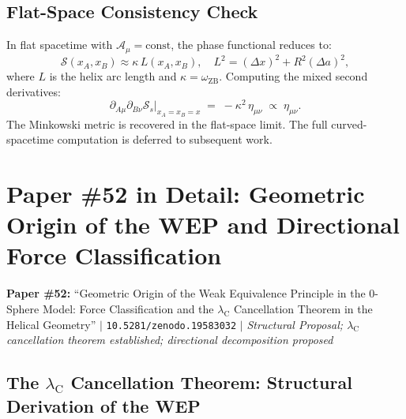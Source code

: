\documentclass[12pt,letterpaper]{article}
\newcommand{\doilink}[1]{\texttt{#1}}
\newcommand{\lambdaC}{\lambda_{\mathrm{C}}}
\newcommand{\calS}{\mathcal{S}}
\newcommand{\calA}{\mathcal{A}}
\begin{document}
\subsection{Flat-Space Consistency Check}

In flat spacetime with $\calA_\mu = \text{const}$, the phase functional reduces to:
\begin{equation}
\calS(x_A, x_B) \approx \kappa\,L(x_A, x_B),
\quad L^2 = (\Delta x)^2 + R^2(\Delta a)^2,
\end{equation}
where $L$ is the helix arc length and $\kappa = \omega_{\mathrm{ZB}}$.
Computing the mixed second derivatives:
\begin{equation}
\partial_{A\mu}\partial_{B\nu}\calS_s\Big|_{x_A=x_B=x}
\;=\; -\kappa^2\,\eta_{\mu\nu}
\;\propto\; \eta_{\mu\nu}.
\end{equation}
The Minkowski metric is recovered in the flat-space limit.
The full curved-spacetime computation is deferred to subsequent work.


\clearpage

\section{\texorpdfstring{Paper \#52 in Detail: Geometric Origin of the WEP and Directional Force Classification}{Paper \#52 in Detail: Geometric Origin of the WEP and Directional Force Classification}}
\label{sec:p52}

\begin{mdframed}[style=orangebox]
\textbf{\textcolor{orange!80!black}{Paper \#52:}} ``Geometric Origin of the Weak Equivalence Principle in the 0-Sphere Model: Force Classification and the $\lambdaC$ Cancellation Theorem in the Helical Geometry'' $|$ \doilink{10.5281/zenodo.19583032} $|$ \textit{Structural Proposal; $\lambdaC$ cancellation theorem established; directional decomposition proposed}
\end{mdframed}

\subsection{The $\lambdaC$ Cancellation Theorem: Structural Derivation of the WEP}
\label{subsec:cancel_theorem}
\end{document}
